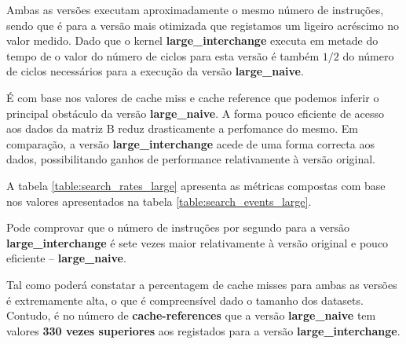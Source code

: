 \documentclass[conference,compsoc]{IEEEtran}
\begin{document}
    Ambas as versões executam aproximadamente o mesmo número de instruções, sendo que é para a versão mais otimizada que registamos um ligeiro acréscimo no valor medido. Dado que o kernel \textbf{large\_interchange} executa em metade do tempo de o valor do número de ciclos para esta versão é também $1/2$ do número de ciclos necessários para a execução da versão \textbf{large\_naive}.\par 

    É com base nos valores de cache miss e cache reference que podemos inferir o principal obstáculo da versão \textbf{large\_naive}. A forma pouco eficiente de acesso aos dados da matriz B reduz drasticamente a perfomance do mesmo. Em comparação, a versão \textbf{large\_interchange} acede de uma forma correcta aos dados, possibilitando ganhos de performance relativamente à versão original.\par 



    A tabela \ref{table:search_rates_large} apresenta as métricas compostas com base nos valores apresentados na tabela \ref{table:search_events_large}.\par
    Pode comprovar que o número de instruções por segundo para a versão \textbf{large\_interchange} é sete vezes maior relativamente à versão original e pouco eficiente -- \textbf{large\_naive}. \par 
    Tal como poderá constatar a percentagem de cache misses para ambas as versões é extremamente alta, o que é compreensível dado o tamanho dos datasets. Contudo, é no número de \textbf{cache-references} que a versão \textbf{large\_naive} tem valores  \textbf{330 vezes superiores} aos registados para a versão  \textbf{large\_interchange}.
\end{document}
